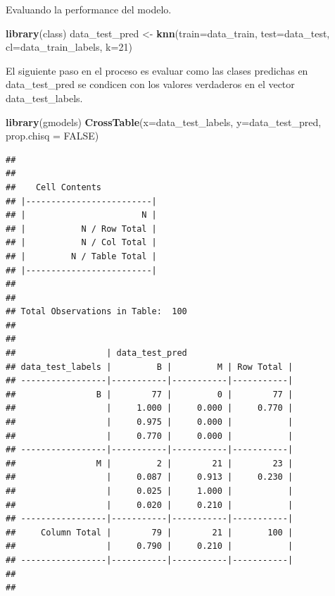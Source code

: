 \documentclass[ignorenonframetext,]{beamer}
\newenvironment{Shaded}{\begin{snugshade}}{\end{snugshade}}
\newcommand{\KeywordTok}[1]{\textcolor[rgb]{0.13,0.29,0.53}{\textbf{#1}}}
\newcommand{\DataTypeTok}[1]{\textcolor[rgb]{0.13,0.29,0.53}{#1}}
\newcommand{\DecValTok}[1]{\textcolor[rgb]{0.00,0.00,0.81}{#1}}
\newcommand{\StringTok}[1]{\textcolor[rgb]{0.31,0.60,0.02}{#1}}
\newcommand{\OtherTok}[1]{\textcolor[rgb]{0.56,0.35,0.01}{#1}}
\newcommand{\NormalTok}[1]{#1}
\begin{document}
\begin{frame}[fragile]

\begin{block}{Evaluando la performance del modelo.}

\begin{Shaded}
\begin{Highlighting}[]
\KeywordTok{library}\NormalTok{(class)}
\NormalTok{data_test_pred <-}\StringTok{ }\KeywordTok{knn}\NormalTok{(}\DataTypeTok{train=}\NormalTok{data_train, }\DataTypeTok{test=}\NormalTok{data_test, }\DataTypeTok{cl=}\NormalTok{data_train_labels, }\DataTypeTok{k=}\DecValTok{21}\NormalTok{)}
\end{Highlighting}
\end{Shaded}

El siguiente paso en el proceso es evaluar como las clases predichas en
data\_test\_pred se condicen con los valores verdaderos en el vector
data\_test\_labels.

\begin{Shaded}
\begin{Highlighting}[]
\KeywordTok{library}\NormalTok{(gmodels)}
\KeywordTok{CrossTable}\NormalTok{(}\DataTypeTok{x=}\NormalTok{data_test_labels, }\DataTypeTok{y=}\NormalTok{data_test_pred, }\DataTypeTok{prop.chisq =} \OtherTok{FALSE}\NormalTok{)}
\end{Highlighting}
\end{Shaded}

\begin{verbatim}
## 
##  
##    Cell Contents
## |-------------------------|
## |                       N |
## |           N / Row Total |
## |           N / Col Total |
## |         N / Table Total |
## |-------------------------|
## 
##  
## Total Observations in Table:  100 
## 
##  
##                  | data_test_pred 
## data_test_labels |         B |         M | Row Total | 
## -----------------|-----------|-----------|-----------|
##                B |        77 |         0 |        77 | 
##                  |     1.000 |     0.000 |     0.770 | 
##                  |     0.975 |     0.000 |           | 
##                  |     0.770 |     0.000 |           | 
## -----------------|-----------|-----------|-----------|
##                M |         2 |        21 |        23 | 
##                  |     0.087 |     0.913 |     0.230 | 
##                  |     0.025 |     1.000 |           | 
##                  |     0.020 |     0.210 |           | 
## -----------------|-----------|-----------|-----------|
##     Column Total |        79 |        21 |       100 | 
##                  |     0.790 |     0.210 |           | 
## -----------------|-----------|-----------|-----------|
## 
## 
\end{verbatim}

\end{block}

\end{frame}
\end{document}
